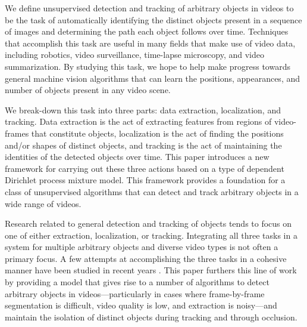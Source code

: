\documentclass[twocolumn, final]{svjour3}
\newcommand{\willie}[1]{\textcolor{green}{\textsf{\emph{\textbf{\textcolor{green}{#1}}}}}}
\begin{document}
We define unsupervised detection and tracking of arbitrary objects in videos to be the task of automatically identifying the distinct objects present in a sequence of images and determining the path each object follows over time. Techniques that accomplish this task are useful in many fields that make use of video data, including robotics, video surveillance, time-lapse microscopy, and video summarization. By studying this task, we hope to help make progress towards general machine vision algorithms that can learn the positions, appearances, and number of objects present in any video scene.

We break-down this task into three parts: data extraction, localization, and tracking. Data extraction is the act of extracting features from regions of video-frames that constitute objects, localization is the act of finding the positions and/or shapes of distinct objects, and tracking is the act of maintaining the identities of the detected objects over time. This paper introduces a new framework for carrying out these three actions based on a type of dependent Dirichlet process mixture model. This framework provides a foundation for a class of unsupervised algorithms that can detect and track arbitrary objects in a wide range of videos.

Research related to general detection and tracking of objects tends to focus on one of either extraction, localization, or tracking. Integrating all three tasks in a system for multiple arbitrary objects and diverse video types is not often a primary focus. A few attempts at accomplishing the three tasks in a cohesive manner have been studied in recent years \cite{brostow2006unsupervised, brox2010object, fragkiadaki2011detection, pece_2002}.
This paper furthers this line of work by providing a model that gives rise to a number of algorithms to detect arbitrary objects in videos---particularly in cases where frame-by-frame segmentation is difficult, video quality is low, and extraction is noisy---and maintain the isolation of distinct objects during tracking and through occlusion.
\end{document}
